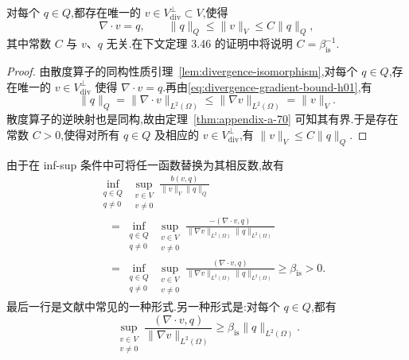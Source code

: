 \begin{corollary}[每个压力都是某个速度场的散度]\label{cor:each-pressure-is-divergence}
对每个 $q\in Q$,都存在唯一的 $v\in V_{\mathrm{div}}^{\perp}\subset V$,使得
\begin{equation}\label{eq:divergence-velocity-norm-equivalence}
  \nabla\cdot v=q,
  \qquad \|q\|_Q\le\|v\|_V\le C\|q\|_Q,
\end{equation}
其中常数 $C$ 与 $v$、$q$ 无关.在下文定理 3.46 的证明中将说明 $C=\beta_{\mathrm{is}}^{-1}$.
\end{corollary}
\begin{proof}
由散度算子的同构性质引理~\ref{lem:divergence-isomorphism},对每个 $q\in Q$,存在唯一的 $v\in V_{\mathrm{div}}^{\perp}$ 使得 $\nabla\cdot v=q$.再由\cref{eq:divergence-gradient-bound-h01},有
\[
  \|q\|_Q=\|\nabla\cdot v\|_{L^2(\Omega)}
    \le\|\nabla v\|_{L^2(\Omega)}=\|v\|_V.
\]
散度算子的逆映射也是同构,故由定理~\ref{thm:appendix-a-70} 可知其有界.于是存在常数 $C>0$,使得对所有 $q\in Q$ 及相应的 $v\in V_{\mathrm{div}}^{\perp}$,有 $\|v\|_V\le C\|q\|_Q$.
\end{proof}

\begin{note}\label{note:infsup-forms-literature}
由于在 inf-sup 条件中可将任一函数替换为其相反数,故有
\[
\begin{aligned}
  &\inf_{\substack{q\in Q\\q\ne0}}
     \sup_{\substack{v\in V\\v\ne0}}
       \frac{b(v,q)}{\|v\|_V\|q\|_Q}\\
  &\quad=\inf_{\substack{q\in Q\\q\ne0}}
     \sup_{\substack{v\in V\\v\ne0}}
       \frac{-(\nabla\cdot v,q)}{\|\nabla v\|_{L^2(\Omega)}\|q\|_{L^2(\Omega)}}\\
  &\quad=\inf_{\substack{q\in Q\\q\ne0}}
     \sup_{\substack{v\in V\\v\ne0}}
       \frac{(\nabla\cdot v,q)}{\|\nabla v\|_{L^2(\Omega)}\|q\|_{L^2(\Omega)}}
       \ge\beta_{\mathrm{is}}>0.
\end{aligned}
\]
最后一行是文献中常见的一种形式.另一种形式是:对每个 $q\in Q$,都有
\begin{equation}\label{eq:infsup-pressure-norm-form}
  \sup_{\substack{v\in V\\v\ne0}}
    \frac{(\nabla\cdot v,q)}{\|\nabla v\|_{L^2(\Omega)}}
    \ge\beta_{\mathrm{is}}\|q\|_{L^2(\Omega)}.
\end{equation}
\end{note}

